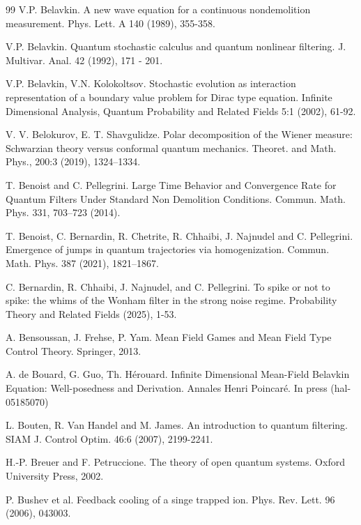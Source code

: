 \documentclass[12pt]{article}
\begin{document}
\begin{thebibliography}{99}
V.P. Belavkin. A new wave equation for a continuous nondemolition
measurement. Phys. Lett. A 140 (1989), 355-358.


 V.P. Belavkin. Quantum stochastic calculus and quantum nonlinear filtering.
 J. Multivar. Anal. 42 (1992), 171 - 201.

V.P. Belavkin, V.N. Kolokoltsov. Stochastic
evolution as interaction representation of a boundary value
problem for Dirac type equation. Infinite Dimensional Analysis,
Quantum Probability and Related Fields 5:1 (2002), 61-92.

V. V. Belokurov, E. T. Shavgulidze.
Polar decomposition of the Wiener measure: Schwarzian theory versus conformal quantum mechanics.
Theoret. and Math. Phys., 200:3 (2019), 1324–1334.

T. Benoist and C. Pellegrini.
Large Time Behavior and Convergence Rate for Quantum
Filters Under Standard Non Demolition Conditions.
Commun. Math. Phys. 331, 703–723 (2014).

T. Benoist, C. Bernardin, R. Chetrite, R. Chhaibi, J. Najnudel and C. Pellegrini.
Emergence of jumps in quantum trajectories via homogenization.
 Commun. Math. Phys. 387 (2021), 1821–1867.

 C. Bernardin, R. Chhaibi, J. Najnudel, and C. Pellegrini. To spike or not to
spike: the whims of the Wonham filter in the strong noise regime. Probability
Theory and Related Fields (2025), 1-53.

A. Bensoussan, J. Frehse, P. Yam. Mean Field Games and Mean Field Type Control Theory.
Springer, 2013.

A. de Bouard, G. Guo, Th. H\'erouard.
Infinite Dimensional Mean-Field Belavkin Equation:
Well-posedness and Derivation.
Annales Henri Poincar\'e. In press (hal-05185070)


L. Bouten, R. Van Handel and M. James. An introduction to quantum filtering.
SIAM J. Control Optim. 46:6 (2007), 2199-2241.

H.-P. Breuer and F. Petruccione.
The theory of open quantum systems. Oxford University Press, 2002.

 P. Bushev et al. Feedback cooling of a singe trapped ion. Phys. Rev. Lett. 96 (2006), 043003.


\end{thebibliography}
\end{document}
